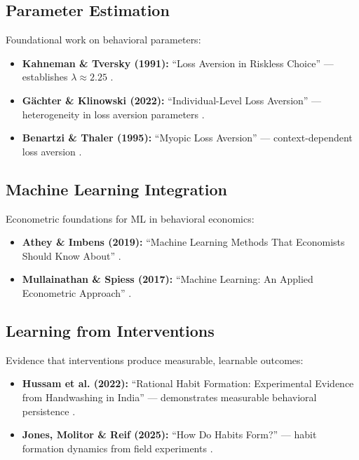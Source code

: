 \subsection{Parameter Estimation}

Foundational work on behavioral parameters:
\begin{itemize}[nosep]
\item \textbf{Kahneman \& Tversky (1991):} ``Loss Aversion in Riskless Choice''
      --- establishes $\lambda \approx 2.25$ \citep{kahneman1991loss}.
\item \textbf{Gächter \& Klinowski (2022):} ``Individual-Level Loss Aversion''
      --- heterogeneity in loss aversion parameters \citep{PAP-gaechter2022lossaversion}.
\item \textbf{Benartzi \& Thaler (1995):} ``Myopic Loss Aversion'' ---
      context-dependent loss aversion \citep{benartzi1995myopic}.
\end{itemize}

\subsection{Machine Learning Integration}

Econometric foundations for ML in behavioral economics:
\begin{itemize}[nosep]
\item \textbf{Athey \& Imbens (2019):} ``Machine Learning Methods That
      Economists Should Know About'' \citep{athey2019machine}.
\item \textbf{Mullainathan \& Spiess (2017):} ``Machine Learning: An Applied
      Econometric Approach'' \citep{mullainathan2017machine}.
\end{itemize}

\subsection{Learning from Interventions}

Evidence that interventions produce measurable, learnable outcomes:
\begin{itemize}[nosep]
\item \textbf{Hussam et al. (2022):} ``Rational Habit Formation: Experimental
      Evidence from Handwashing in India'' --- demonstrates measurable
      behavioral persistence \citep{HussamEtAl2022}.
\item \textbf{Jones, Molitor \& Reif (2025):} ``How Do Habits Form?'' ---
      habit formation dynamics from field experiments \citep{JonesMolitorReif2025}.
\end{itemize}


